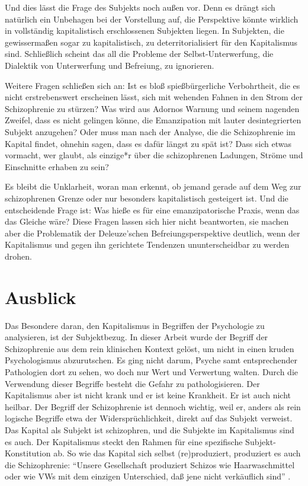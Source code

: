 \documentclass[12pt,
               paper=a4,
               twoside=false,
               onehalfspacing,
               bibliography=totoc,
               toc=graduated,
               ]{scrartcl}
\newcommand{\pc}[2]{\parencite[#1]{#2}}
\begin{document}
Und dies lässt die Frage des Subjekts noch außen vor. Denn es drängt
sich natürlich ein Unbehagen bei der Vorstellung auf, die Perspektive
könnte wirklich in vollständig kapitalistisch erschlossenen Subjekten
liegen. In Subjekten, die gewissermaßen sogar zu kapitalistisch, zu
deterritorialisiert für den Kapitalismus sind. Schließlich scheint das
all die Probleme der Selbst-Unterwerfung, die Dialektik von
Unterwerfung und Befreiung, zu ignorieren.

Weitere Fragen schließen sich an: Ist es bloß spießbürgerliche
Verbohrtheit, die es nicht erstrebenswert erscheinen lässt, sich mit
wehenden Fahnen in den Strom der Schizophrenie zu stürzen? Was wird
aus Adornos Warnung und seinem nagenden Zweifel, dass es nicht
gelingen könne, die Emanzipation mit lauter desintegrierten Subjekt
anzugehen? Oder muss man nach der Analyse, die die Schizophrenie im
Kapital findet, ohnehin sagen, dass es dafür längst zu spät ist? Dass
sich etwas vormacht, wer glaubt, als einzige*r über die schizophrenen
Ladungen, Ströme und Einschnitte erhaben zu sein?

Es bleibt die Unklarheit, woran man erkennt, ob jemand gerade auf dem
Weg zur schizophrenen Grenze oder nur besonders kapitalistisch
gesteigert ist. Und die entscheidende Frage ist: Was hieße es für eine
emanzipatorische Praxis, wenn das das Gleiche wäre? Diese Fragen
lassen sich hier nicht beantworten, sie machen aber die Problematik
der Deleuze'schen Befreiungsperspektive deutlich, wenn der
Kapitalismus und gegen ihn gerichtete Tendenzen ununterscheidbar zu
werden drohen.



\section{Ausblick}

Das Besondere daran, den Kapitalismus in Begriffen der Psychologie zu
analysieren, ist der Subjektbezug. In dieser Arbeit wurde der Begriff
der Schizophrenie aus dem rein klinischen Kontext gelöst, um nicht in
einen kruden Psychologismus abzurutschen. Es ging nicht darum, Psyche
samt entsprechender Pathologien dort zu sehen, wo doch nur Wert und
Verwertung walten. Durch die Verwendung dieser Begriffe besteht die
Gefahr zu pathologisieren. Der Kapitalismus aber ist nicht krank und
er ist keine Krankheit. Er ist auch nicht heilbar. Der Begriff der
Schizophrenie ist dennoch wichtig, weil er, anders als rein logische
Begriffe etwa der Widersprüchlichkeit, direkt auf das Subjekt
verweist. Das Kapital als Subjekt ist schizophren, und die Subjekte im
Kapitalismus sind es auch. Der Kapitalismus steckt den Rahmen für eine
spezifische Subjekt-Konstitution ab. So wie das Kapital sich selbst
(re)produziert, produziert es auch die Schizophrenie: "`Unsere
Gesellschaft produziert Schizos wie Haarwaschmittel oder wie VWs mit
dem einzigen Unterschied, daß jene nicht verkäuflich sind"' \pc{S. 315
f.}{ao}.
\end{document}
